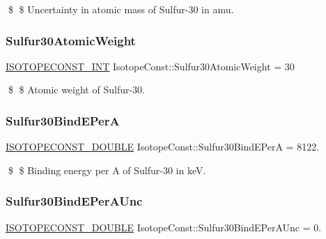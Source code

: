 \$ \$ Uncertainty in atomic mass of Sulfur-\/30 in amu. \mbox{\label{group___isotope_const-_sulfur-_s30_ga56f8f75703c0efa21e21c24bcdac7247}} 
\subsubsection{\texorpdfstring{Sulfur30\+Atomic\+Weight}{Sulfur30AtomicWeight}}
{\footnotesize\ttfamily \mbox{\hyperlink{group___isotope_const-_macros_ga5f18360b3e99483a35c32d789e62621c}{I\+S\+O\+T\+O\+P\+E\+C\+O\+N\+S\+T\+\_\+\+I\+NT}} Isotope\+Const\+::\+Sulfur30\+Atomic\+Weight = 30}

\$ \$ Atomic weight of Sulfur-\/30. \mbox{\label{group___isotope_const-_sulfur-_s30_ga3371da16a71349f2eafa48a01a8c6d05}} 
\subsubsection{\texorpdfstring{Sulfur30\+Bind\+E\+PerA}{Sulfur30BindEPerA}}
{\footnotesize\ttfamily \mbox{\hyperlink{group___isotope_const-_macros_ga8f45a7272ce02c0b4c65c44636ed719a}{I\+S\+O\+T\+O\+P\+E\+C\+O\+N\+S\+T\+\_\+\+D\+O\+U\+B\+LE}} Isotope\+Const\+::\+Sulfur30\+Bind\+E\+PerA = 8122.}

\$ \$ Binding energy per A of Sulfur-\/30 in keV. \mbox{\label{group___isotope_const-_sulfur-_s30_gace4f7f408e51078e04007e891153fa96}} 
\subsubsection{\texorpdfstring{Sulfur30\+Bind\+E\+Per\+A\+Unc}{Sulfur30BindEPerAUnc}}
{\footnotesize\ttfamily \mbox{\hyperlink{group___isotope_const-_macros_ga8f45a7272ce02c0b4c65c44636ed719a}{I\+S\+O\+T\+O\+P\+E\+C\+O\+N\+S\+T\+\_\+\+D\+O\+U\+B\+LE}} Isotope\+Const\+::\+Sulfur30\+Bind\+E\+Per\+A\+Unc = 0.}

